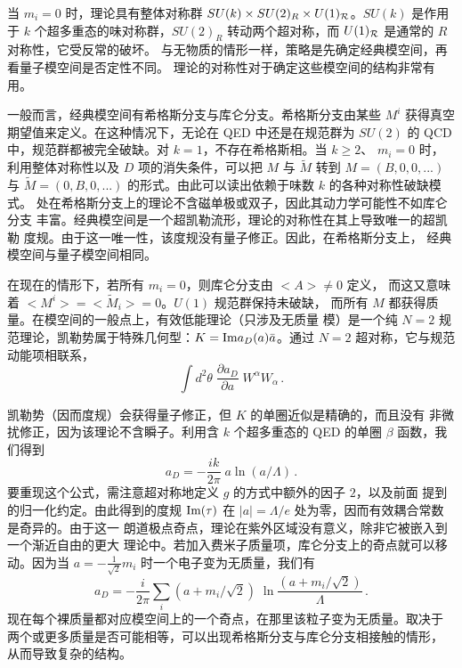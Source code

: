当 $m_i = 0$ 时，理论具有整体对称群 $SU(k)\times SU(2)_R \times
U(1)_{\cal R}$。$SU(k)$ 是作用于 $k$ 个超多重态的味对称群，$SU(2)_R$
转动两个超对称，而 $U(1)_{\cal R}$ 是通常的 $R$ 对称性，它受反常的破坏。
与无物质的情形一样，策略是先确定经典模空间，再看量子模空间是否定性不同。
理论的对称性对于确定这些模空间的结构非常有用。


一般而言，经典模空间有希格斯分支与库仑分支。希格斯分支由某些 $M^i$
获得真空期望值来定义。在这种情况下，无论在 QED 中还是在规范群为 $SU(2)$
的 QCD 中，规范群都被完全破缺。对 $k=1$，不存在希格斯相。当 $k \geq 2$、
$m_i = 0$ 时，利用整体对称性以及 $D$ 项的消失条件，可以把 $M$ 与
$\widetilde M$ 转到 $M=(B,0,0,...)$ 与 $\widetilde M = (0,
B,0,...)$ 的形式。由此可以读出依赖于味数 $k$ 的各种对称性破缺模式。
处在希格斯分支上的理论不含磁单极或双子，因此其动力学可能性不如库仑分支
丰富。经典模空间是一个超凯勒流形，理论的对称性在其上导致唯一的超凯勒
度规。由于这一唯一性，该度规没有量子修正。因此，在希格斯分支上，
经典模空间与量子模空间相同。

在现在的情形下，若所有 $m_i = 0$，则库仑分支由 $<A> \not= 0$ 定义，
而这又意味着 $<M^i>=<\widetilde M_i>=0$。$U(1)$ 规范群保持未破缺，
而所有 $M$ 都获得质量。在模空间的一般点上，有效低能理论（只涉及无质量
模）是一个纯 $N=2$ 规范理论，凯勒势属于特殊几何型：$K={\rm Im} a_D (a)
\bar{a}$。通过 $N=2$ 超对称，它与规范动能项相联系，
$$
\int d^2 \theta \; \frac{\partial a_D}{\partial a} \;
W^{\alpha}W_{\alpha}\,.
$$

凯勒势（因而度规）会获得量子修正，但 $K$ 的单圈近似是精确的，而且没有
非微扰修正，因为该理论不含瞬子。利用含 $k$ 个超多重态的 QED 的单圈
$\beta$ 函数，我们得到
\begin{equation}
a_D = - \frac{ik}{2\pi} \; a \ln (a/\Lambda)\,.
\label{beta-hyper}
\end{equation}
要重现这个公式，需注意超对称地定义 $g$ 的方式中额外的因子 $2$，以及前面
提到的归一化约定。由此得到的度规 ${\rm Im}
(\tau)$ 在 $|a| = \Lambda / e$ 处为零，因而有效耦合常数是奇异的。由于这一
朗道极点奇点，理论在紫外区域没有意义，除非它被嵌入到一个渐近自由的更大
理论中。若加入费米子质量项，库仑分支上的奇点就可以移动。因为当 $a = -
\frac{1}{\sqrt{2}} m_i$ 时一个电子变为无质量，我们有
$$
a_D = - \frac{i}{2\pi} \sum_i (a+m_i / \sqrt{2}) \;\ln
\frac{(a+m_i / \sqrt{2})}{\Lambda}\,.
$$
现在每个裸质量都对应模空间上的一个奇点，在那里该粒子变为无质量。取决于
两个或更多质量是否可能相等，可以出现希格斯分支与库仑分支相接触的情形，
从而导致复杂的结构。

